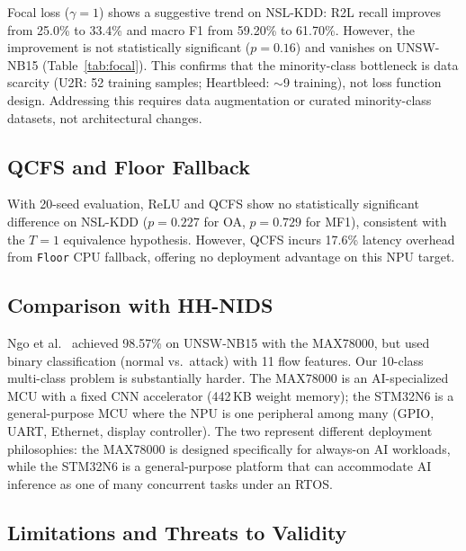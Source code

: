\documentclass[10pt,twocolumn]{article}
\begin{document}
Focal loss ($\gamma{=}1$) shows a suggestive trend on NSL-KDD:
R2L recall improves from 25.0\% to 33.4\% and macro F1 from
59.20\% to 61.70\%. However, the improvement is not statistically
significant ($p{=}0.16$) and vanishes on UNSW-NB15 (Table~\ref{tab:focal}).
This confirms that the minority-class bottleneck is data scarcity
(U2R: 52 training samples; Heartbleed: ${\sim}$9 training), not loss function design.
Addressing this requires data augmentation or curated minority-class
datasets, not architectural changes.

\subsection{QCFS and Floor Fallback}

With 20-seed evaluation, ReLU and QCFS show no statistically
significant difference on NSL-KDD ($p{=}0.227$ for OA, $p{=}0.729$
for MF1), consistent with the $T{=}1$ equivalence hypothesis.
However, QCFS incurs 17.6\% latency overhead from \texttt{Floor}
CPU fallback, offering no deployment advantage on this NPU target.

\subsection{Comparison with HH-NIDS}

Ngo et al.~\cite{ngo2022hhnids} achieved 98.57\% on UNSW-NB15 with the
MAX78000, but used binary classification (normal vs.\ attack) with
11 flow features. Our 10-class multi-class problem is substantially harder.
The MAX78000 is an AI-specialized MCU with a fixed CNN
accelerator (442\,KB weight memory); the STM32N6 is a general-purpose
MCU where the NPU is one peripheral among many (GPIO, UART, Ethernet,
display controller). The two represent different deployment philosophies:
the MAX78000 is designed specifically for always-on AI workloads,
while the STM32N6 is a general-purpose platform that can accommodate
AI inference as one of many concurrent tasks under an RTOS.

\subsection{Limitations and Threats to Validity}
\end{document}
